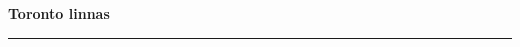 \documentclass[10pt]{book}
\begin{document}
{
  \samepage
  \raggedbottom
  \raggedright
  \sloppy


  \vspace{0.2in}

  \noindent\begin{minipage}{.1\textwidth}
    \hfill\vspace{0.1in}
  \end{minipage}%
  \noindent\begin{minipage}{.8\textwidth}
    \centering
    \bfseries
    \large Toronto linnas
  \end{minipage}%
  \noindent\begin{minipage}{.1\textwidth}
      \hfill\vspace{0.1in}
  \end{minipage}

  \nopagebreak[4]
  \vspace{0.1in}
  \nopagebreak[4]
  \hrule height 0.05ex
  \nopagebreak[4]
  \vspace{-0.05in}




}
\end{document}
